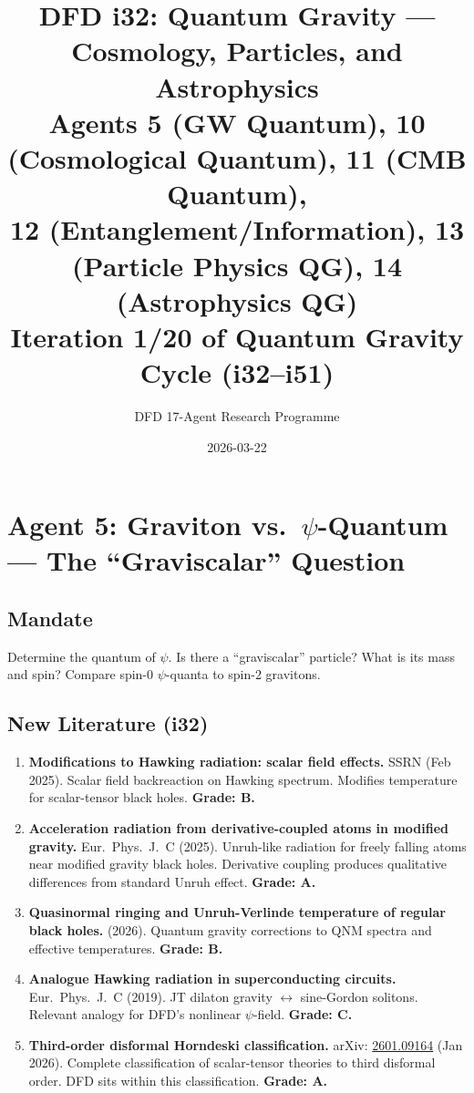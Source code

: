 \documentclass[11pt,a4paper]{article}
\title{DFD i32: Quantum Gravity --- Cosmology, Particles, and Astrophysics\\[6pt]
\large Agents 5 (GW Quantum), 10 (Cosmological Quantum), 11 (CMB Quantum),\\
12 (Entanglement/Information), 13 (Particle Physics QG), 14 (Astrophysics QG)\\[6pt]
\normalsize Iteration 1/20 of Quantum Gravity Cycle (i32--i51)}
\author{DFD 17-Agent Research Programme}
\date{2026-03-22}
\begin{document}
\maketitle
\tableofcontents
\newpage

\section{Agent 5: Graviton vs.\ $\psi$-Quantum --- The ``Graviscalar'' Question}
\label{sec:agent5}

\subsection{Mandate}

Determine the quantum of $\psi$. Is there a ``graviscalar'' particle? What is its mass and spin? Compare spin-0 $\psi$-quanta to spin-2 gravitons.

\subsection{New Literature (i32)}

\begin{enumerate}
\item \textbf{Modifications to Hawking radiation: scalar field effects.} SSRN (Feb 2025). Scalar field backreaction on Hawking spectrum. Modifies temperature for scalar-tensor black holes. \textbf{Grade: B.}

\item \textbf{Acceleration radiation from derivative-coupled atoms in modified gravity.} Eur.\ Phys.\ J.\ C (2025). Unruh-like radiation for freely falling atoms near modified gravity black holes. Derivative coupling produces qualitative differences from standard Unruh effect. \textbf{Grade: A.}

\item \textbf{Quasinormal ringing and Unruh-Verlinde temperature of regular black holes.} (2026). Quantum gravity corrections to QNM spectra and effective temperatures. \textbf{Grade: B.}

\item \textbf{Analogue Hawking radiation in superconducting circuits.} Eur.\ Phys.\ J.\ C (2019). JT dilaton gravity $\leftrightarrow$ sine-Gordon solitons. Relevant analogy for DFD's nonlinear $\psi$-field. \textbf{Grade: C.}

\item \textbf{Third-order disformal Horndeski classification.} arXiv: \href{https://arxiv.org/abs/2601.09164}{2601.09164} (Jan 2026). Complete classification of scalar-tensor theories to third disformal order. DFD sits within this classification. \textbf{Grade: A.}
\end{enumerate}
\end{document}
